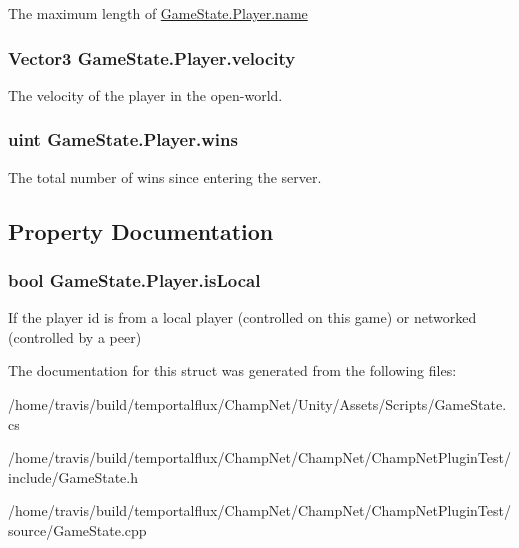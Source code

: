 The maximum length of \hyperlink{class_game_state_1_1_player_afc2b145df544ca5bffc7c87ef294bcde}{Game\-State.\-Player.\-name} 

\hypertarget{class_game_state_1_1_player_aa22122c85cfdae428d82bd1571ab022a}{
\subsubsection[{velocity}]{\setlength{\rightskip}{0pt plus 5cm}Vector3 Game\-State.\-Player.\-velocity}}\label{class_game_state_1_1_player_aa22122c85cfdae428d82bd1571ab022a}


The velocity of the player in the open-\/world. 

\hypertarget{class_game_state_1_1_player_a3a4d13459cad9bd58e058ddc6387af70}{
\subsubsection[{wins}]{\setlength{\rightskip}{0pt plus 5cm}uint Game\-State.\-Player.\-wins}}\label{class_game_state_1_1_player_a3a4d13459cad9bd58e058ddc6387af70}


The total number of wins since entering the server. 



\subsection{Property Documentation}
\hypertarget{class_game_state_1_1_player_affd7c601a6d763dafdc59a58c415e9e7}{
\subsubsection[{is\-Local}]{\setlength{\rightskip}{0pt plus 5cm}bool Game\-State.\-Player.\-is\-Local\hspace{0.3cm}{\ttfamily [get]}}}\label{class_game_state_1_1_player_affd7c601a6d763dafdc59a58c415e9e7}


If the player id is from a local player (controlled on this game) or networked (controlled by a peer) 



The documentation for this struct was generated from the following files\-:\begin{DoxyCompactItemize}
\item 
/home/travis/build/temportalflux/\-Champ\-Net/\-Unity/\-Assets/\-Scripts/Game\-State.\-cs\item 
/home/travis/build/temportalflux/\-Champ\-Net/\-Champ\-Net/\-Champ\-Net\-Plugin\-Test/include/Game\-State.\-h\item 
/home/travis/build/temportalflux/\-Champ\-Net/\-Champ\-Net/\-Champ\-Net\-Plugin\-Test/source/Game\-State.\-cpp\end{DoxyCompactItemize}
